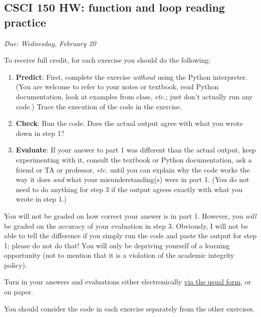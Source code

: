\documentclass[]{article}
\date{}
\begin{document}
\subsection{CSCI 150 HW: function and loop reading
practice}\label{csci-150-hw-function-and-loop-reading-practice}

\emph{Due: Wednesday, February 20}

To receive full credit, for each exercise you should do the following:

\begin{enumerate}
\def\labelenumi{\arabic{enumi}.}
\item
  \textbf{Predict}: First, complete the exercise \emph{without} using
  the Python interpreter. (You are welcome to refer to your notes or
  textbook, read Python documentation, look at examples from class,
  \emph{etc.}; just don't actually run any code.) Trace the execution of
  the code in the exercise.
\item
  \textbf{Check}: Run the code. Does the actual output agree with what
  you wrote down in step 1?
\item
  \textbf{Evaluate}: If your answer to part 1 was different than the
  actual output, keep experimenting with it, consult the textbook or
  Python documentation, ask a friend or TA or professor, \emph{etc.}
  until you can explain why the code works the way it does \emph{and}
  what your misunderstanding(s) were in part 1. (You do not need to do
  anything for step 3 if the output agrees exactly with what you wrote
  in step 1.)
\end{enumerate}

You will not be graded on how correct your answer is in part 1. However,
you \emph{will} be graded on the accuracy of your evaluation in step 3.
Obviously, I will not be able to tell the difference if you simply run
the code and paste the output for step 1; please do not do that! You
will only be depriving yourself of a learning opportunity (not to
mention that it is a violation of the academic integrity policy).

Turn in your answers and evaluations either electronically
\href{https://goo.gl/forms/XsJVafSZLdedQY1M2}{via the usual form}, or on
paper.

You should consider the code in each exercise separately from the other
exercises.
\end{document}
